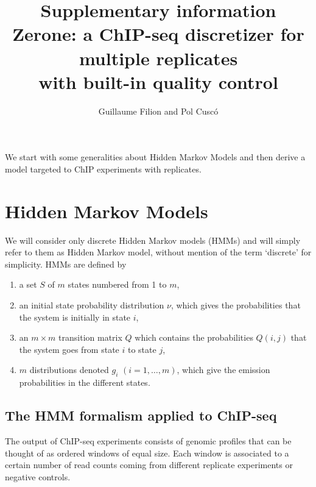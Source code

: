 \documentclass[12pt]{article}
\title{Supplementary information \\
\large{Zerone: a ChIP-seq discretizer for multiple replicates \\
with built-in quality control}}
\author{Guillaume Filion and Pol Cusc\'o}
\begin{document}
\maketitle


We start with some generalities about Hidden Markov Models and then
derive a model targeted to ChIP experiments with replicates.
  
\section{Hidden Markov Models}

    We will consider only discrete Hidden Markov models (HMMs) and
    will simply refer to them as Hidden Markov model, without mention
    of the term `discrete' for simplicity.  HMMs are defined by 

    \begin{enumerate}
      \item a set $S$ of $m$ states numbered from 1 to $m$,
      \item an initial state probability distribution $\nu$, which
      gives the probabilities that the system is initially in state $i$,
      \item an $m \times m$ transition matrix $Q$ which contains the
      probabilities $Q(i,j)$ that the system goes from state $i$ to
      state $j$,
      \item $m$ distributions denoted $g_i$ $(i = 1, \ldots, m)$, which
      give the emission probabilities in the different states.
    \end{enumerate}

\subsection{The HMM formalism applied to ChIP-seq}
\label{sec:HMM_formalism}

    The output of ChIP-seq experiments consists of genomic profiles
    that can be thought of as ordered windows of equal size. Each
    window is associated to a certain number of read counts coming
    from different replicate experiments or negative controls.
\end{document}
